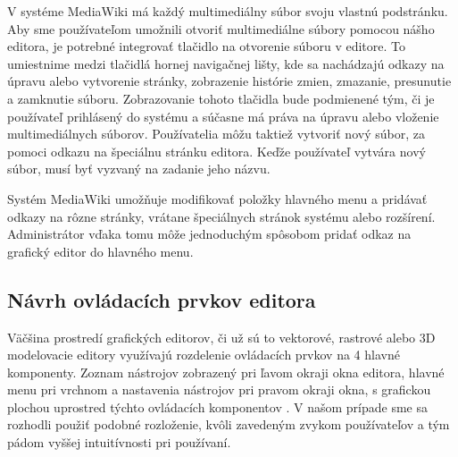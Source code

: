 V systéme MediaWiki má každý multimediálny súbor svoju vlastnú podstránku. Aby sme používateľom umožnili otvoriť multimediálne súbory pomocou nášho editora, je potrebné integrovať tlačidlo na otvorenie súboru v editore. To umiestnime medzi tlačidlá hornej navigačnej lišty, kde sa nachádzajú odkazy na úpravu alebo vytvorenie stránky, zobrazenie histórie zmien, zmazanie, presunutie a zamknutie súboru. Zobrazovanie tohoto tlačidla bude podmienené tým, či je používateľ prihlásený do systému a súčasne má práva na úpravu alebo vloženie multimediálnych súborov. Používatelia môžu taktiež vytvoriť nový súbor, za pomoci odkazu na špeciálnu stránku editora. Keďže používateľ vytvára nový súbor, musí byť vyzvaný na zadanie jeho názvu. 

Systém MediaWiki umožňuje modifikovať položky hlavného menu a pridávať odkazy na rôzne stránky, vrátane špeciálnych stránok systému alebo rozšírení. Administrátor vďaka tomu môže jednoduchým spôsobom pridať odkaz na grafický editor do hlavného menu.

\subsection{Návrh ovládacích prvkov editora}
Väčšina prostredí grafických editorov, či už sú to vektorové, rastrové alebo 3D modelovacie editory využívajú rozdelenie ovládacích prvkov na 4 hlavné komponenty. Zoznam nástrojov zobrazený pri ľavom okraji okna editora, hlavné menu pri vrchnom a nastavenia nástrojov pri pravom okraji okna, s grafickou plochou uprostred týchto ovládacích komponentov . V našom prípade sme sa rozhodli použiť podobné rozloženie, kvôli zavedeným zvykom používateľov a tým pádom vyššej intuitívnosti pri používaní.


